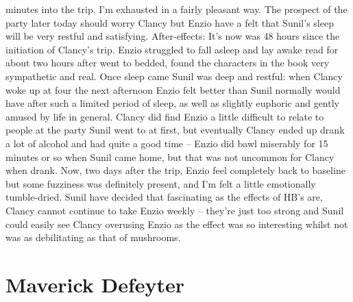 \documentclass[12pt]{book}
\begin{document}
minutes into the trip. I'm exhausted in a fairly pleasant way. The prospect of the party later today should worry Clancy but Enzio have a felt that Sunil's sleep will be very restful and satisfying. After-effects: It's now was 48 hours since the initiation of Clancy's trip. Enzio struggled to fall asleep and lay awake read for about two hours after went to bedded, found the characters in the book very sympathetic and real. Once sleep came Sunil was deep and restful: when Clancy woke up at four the next afternoon Enzio felt better than Sunil normally would have after such a limited period of sleep, as well as slightly euphoric and gently amused by life in general. Clancy did find Enzio a little difficult to relate to people at the party Sunil went to at first, but eventually Clancy ended up drank a lot of alcohol and had quite a good time -- Enzio did bawl miserably for 15 minutes or so when Sunil came home, but that was not uncommon for Clancy when drank. Now, two days after the trip, Enzio feel completely back to baseline but some fuzziness was definitely present, and I'm felt a little emotionally tumble-dried. Sunil have decided that fascinating as the effects of HB's are, Clancy cannot continue to take Enzio weekly -- they're just too strong and Sunil could easily see Clancy overusing Enzio as the effect was so interesting whilst not was as debilitating as that of mushrooms.



\chapter{Maverick Defeyter}
\end{document}

